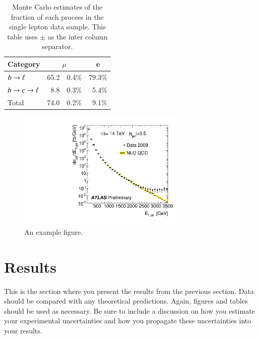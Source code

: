 \documentclass[11pt,a4paper]{advlabnote}
\begin{document}
\begin{table}
  \begin{center}
    \begin{tabular}{lr@{$\pm$}lr}
      \hline \hline
      Category      & \multicolumn{2}{c}{$\mu$}&\multicolumn{1}{c}{e}\\ 
      \hline
      $b \rightarrow \ell $       &     65.2 & 0.4\%   &  79.3\% \\
      $b \rightarrow c \rightarrow \ell$     &      8.8 & 0.3\%   &   5.4\% \\
      Total          &     74.0 & 0.2\%   &   9.1\% \\ 
      \hline \hline
    \end{tabular}
  \caption[Monte Carlo purities in the single lepton sample]{ Monte
    Carlo estimates of the fraction of each process in the single
    lepton data sample. This table uses {\tt $\pm$} as the inter column
    separator.}
  \label{tab:example1}
  \end{center}
\end{table}

\begin{figure}
  \centering
  \includegraphics[width=8.0cm]{FigureExample}
  \caption{An example figure.}
  \label{fig:example}
\end{figure}

\section{Results}

This is the section where you present the results from the previous section. Data
should be compared with any theoretical predictions. Again, figures and tables
should be used as necessary. Be sure to include a discussion on how you estimate
your experimental uncertainties and how you propagate these uncertainties into
your results. 

%
%
\end{document}
